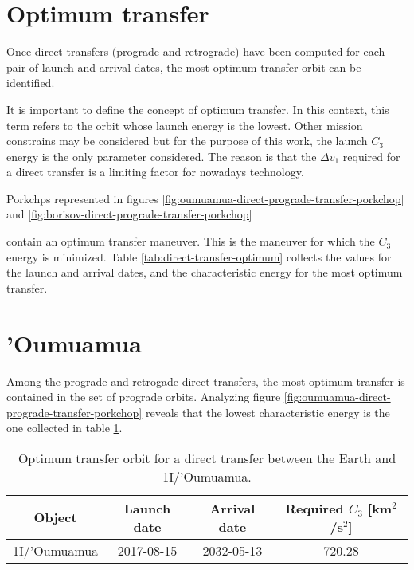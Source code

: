\section{Optimum transfer}

Once direct transfers (prograde and retrograde) have been computed for each pair
of launch and arrival dates, the most optimum transfer orbit can be identified.

It is important to define the concept of optimum transfer. In this context, this
term refers to the orbit whose launch energy is the lowest. Other mission
constrains may be considered but for the purpose of this work, the launch $C_3$
energy is the only parameter considered. The reason is that the $\Delta v_1$
required for a direct transfer is a limiting factor for nowadays technology.

Porkchps represented in figures \ref{fig:oumuamua-direct-prograde-transfer-porkchop} and
\ref{fig:borisov-direct-prograde-transfer-porkchop}


contain an optimum transfer maneuver. This is the maneuver
for which the $C_3$ energy is minimized. Table \ref{tab:direct-transfer-optimum}
collects the values for the launch and arrival dates, and the
characteristic energy for the most optimum transfer.

\section{'Oumuamua}

Among the prograde and retrogade direct transfers, the most optimum transfer is
contained in the set of prograde orbits. Analyzing figure
\ref{fig:oumuamua-direct-prograde-transfer-porkchop} reveals that the lowest
characteristic energy is the one collected in table \ref{tab:oumua-direct-transfer-optimum}.

\vspace{0.5cm}
\begin{table}[H]
  \centering
  \begin{tabular}{|c|c|c|c|}
    \hline
    Object & Launch date & Arrival date & Required $C_3$ [km$^2$/s$^2$] \\
    \hline
    1I/'Oumuamua & 2017-08-15 & 2032-05-13 & 720.28 \\
    \hline
  \end{tabular}
  \caption{Optimum transfer orbit for a direct transfer between the Earth and 1I/'Oumuamua.}
  \label{tab:oumua-direct-transfer-optimum}
\end{table}

